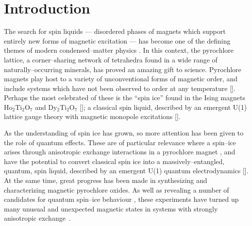 \documentclass[apsrev4-1,prx,superscriptaddress,floatfix,twocolumn,longbibliography]{revtex4-1}
\begin{document}
\maketitle

\section{Introduction}
\label{sec:intro}


The search for spin liquids --- disordered phases of magnets which support entirely 
new forms of magnetic excitation --- has become one of 
the defining themes of modern condensed--matter physics \cite{anderson73,lee08,balents10}.
%
In this context, the pyrochlore lattice, a corner--sharing network of 
tetrahedra found in a wide range of naturally--occurring minerals, has 
proved an amazing gift to science.
%
Pyrochlore magnets play host to a variety of unconventional forms 
of magnetic order, and include systems which have not been observed to order 
at any temperature [].  
%
Perhaps the most celebrated of these is the  ``spin ice'' found in the 
Ising magnets  Ho$_2$Ti$_2$O$_7$ and Dy$_2$Ti$_2$O$_7$ []; 
a classical spin liquid, described by an emergent U(1) lattice gauge theory 
with magnetic monopole excitations 
[].   


As the understanding of spin ice has grown, so more attention has 
been given to the role of quantum effects.
%
These are of particular relevance where a spin--ice arises through
anisotropic exchange interactions in a pyrochlore magnet
\cite{curnoe07,molavian07, Onoda2010, Onoda2011a,
ross11-PRX1,mcclarty14}, and have
the potential to convert classical spin ice into a
massively--entangled, quantum, spin liquid, described by an emergent
U(1) quantum electrodynamics
[].
%
At the same time, great progress has been made in synthesizing
and characterizing magnetic pyrochlore oxides.
%
As well as revealing a number of candidates for quantum spin--ice 
behaviour \cite{Zhou2008,chang12-NatCommun3,
Fennell2012,Kimura2013,Sibille2015,Sibille16a,Anand16a,Wen2017,sibille-arXiv}, 
these experiments have turned up many unusual and 
unexpected magnetic states in systems with strongly anisotropic 
exchange~\cite{DalmasDeReotier2006,dun13,
Yaouanc2013a,taniguchi13,Hallas2014,hallas15,hallas16-PRB93.100403,Petit2016,petit16-PRB94,Takatsu16,hallas-arXiv.1708.01312}.
 
\end{document}
